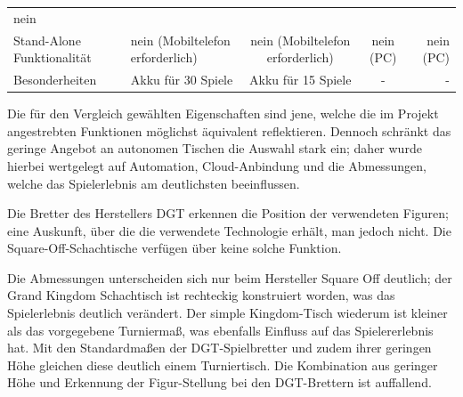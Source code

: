 \begin{longtable}[]{@{}llccr@{}}
\begin{minipage}[t]{0.13\columnwidth}
nein\strut
\end{minipage}\tabularnewline
\begin{minipage}[t]{0.19\columnwidth}\raggedright
Stand-Alone Funktionalität\strut
\end{minipage} & \begin{minipage}[t]{0.19\columnwidth}\raggedright
nein (Mobiltelefon erforderlich)\strut
\end{minipage} & \begin{minipage}[t]{0.20\columnwidth}\centering
nein (Mobiltelefon erforderlich)\strut
\end{minipage} & \begin{minipage}[t]{0.15\columnwidth}\centering
nein (PC)\strut
\end{minipage} & \begin{minipage}[t]{0.13\columnwidth}\raggedleft
nein (PC)\strut
\end{minipage}\tabularnewline
\begin{minipage}[t]{0.19\columnwidth}\raggedright
Besonderheiten\strut
\end{minipage} & \begin{minipage}[t]{0.19\columnwidth}\raggedright
Akku für 30 Spiele\strut
\end{minipage} & \begin{minipage}[t]{0.20\columnwidth}\centering
Akku für 15 Spiele\strut
\end{minipage} & \begin{minipage}[t]{0.15\columnwidth}\centering
-\strut
\end{minipage} & \begin{minipage}[t]{0.13\columnwidth}\raggedleft
-\strut
\end{minipage}\tabularnewline
\bottomrule
\end{longtable}

Die für den Vergleich gewählten Eigenschaften sind jene, welche die im
Projekt angestrebten Funktionen möglichst äquivalent reflektieren.
Dennoch schränkt das geringe Angebot an autonomen Tischen die Auswahl
stark ein; daher wurde hierbei wertgelegt auf Automation,
Cloud-Anbindung und die Abmessungen, welche das Spielerlebnis am
deutlichsten beeinflussen.

Die Bretter des Herstellers DGT erkennen die Position der verwendeten
Figuren; eine Auskunft, über die die verwendete Technologie erhält, man
jedoch nicht. Die Square-Off-Schachtische verfügen über keine solche
Funktion.

Die Abmessungen unterscheiden sich nur beim Hersteller Square Off
deutlich; der Grand Kingdom Schachtisch ist rechteckig konstruiert
worden, was das Spielerlebnis deutlich verändert. Der simple
Kingdom-Tisch wiederum ist kleiner als das vorgegebene Turniermaß, was
ebenfalls Einfluss auf das Spielererlebnis hat. Mit den Standardmaßen
der DGT-Spielbretter und zudem ihrer geringen Höhe gleichen diese
deutlich einem Turniertisch. Die Kombination aus geringer Höhe und
Erkennung der Figur-Stellung bei den DGT-Brettern ist auffallend.

